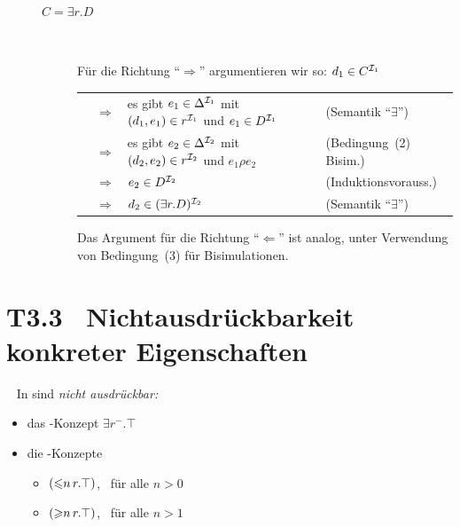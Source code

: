 \documentclass[fontsize=11pt, twoside=false, numbers=autoenddot]{scrbook}
\begin{document}
\begin{beweis}
\begin{description}
\begin{description}
\begin{center}
\begin{tabular}{@{}llp{40mm}l@{}}
            \end{tabular}
          \end{center}
          \parI
        \item[{\boldmath $C=\exists r.D$}]
          ~\par
          Für die Richtung "`$\Rightarrow$"' argumentieren wir so:
          \parIII
          $d_1 \in C^{\mathcal{I}_1}$ \\
          \begin{tabular}{@{}l@{}l@{~\,}l@{~~}l@{}}
            & $\Rightarrow$ & es gibt $e_1 \in \Delta^{\mathcal{I}_1}$ mit $(d_1,e_1) \in r^{\mathcal{I}_1}$ und $e_1 \in D^{\mathcal{I}_1}$ & (Semantik "`$\exists$"') \\
            & $\Rightarrow$ & es gibt $e_2 \in \Delta^{\mathcal{I}_2}$ mit $(d_2,e_2) \in r^{\mathcal{I}_2}$ und $e_1\rho e_2$ & (Bedingung~(2) Bisim.) \\
            & $\Rightarrow$ & $e_2 \in D^{\mathcal{I}_2}$ & (Induktionsvorauss.) \\
            & $\Rightarrow$ & $d_2 \in (\exists r.D)^{\mathcal{I}_2}$ & (Semantik "`$\exists$"')
          \end{tabular}
          \parIII
          Das Argument für die Richtung "`$\Leftarrow$"' ist analog,
          unter Verwendung von Bedingung~(3) für Bisimulationen.
          \qedhere
      \end{description}
  \end{description}
\end{beweis}

\section*{T3.3~ Nichtausdrückbarkeit konkreter Eigenschaften}

~
In \ALC sind \emph{nicht ausdr\"uckbar:}
%
\begin{itemize}
  \item
    das \ALCI-Konzept $\exists r^- . \top$
  \item
    die \ALCQ-Konzepte 
    \begin{itemize}
      \item
        $(\mathord{\leqslant}n\,r.\top)$,~ f\"ur alle $n > 0$
      \item
        $(\mathord{\geqslant}n\,r.\top)$,~ f\"ur alle $n > 1$
    \end{itemize}
\end{itemize}
\end{document}
